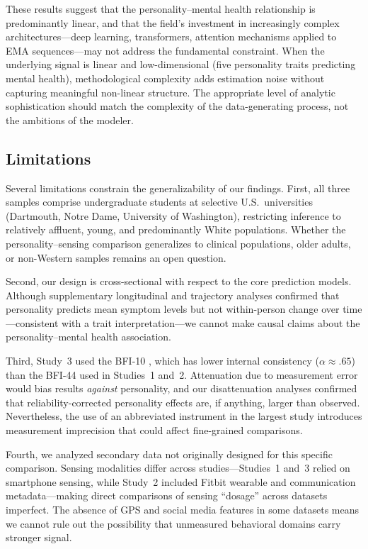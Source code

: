 \documentclass[12pt, a4paper]{article}
\begin{document}
These results suggest that the personality--mental health relationship is predominantly linear, and that the field's investment in increasingly complex architectures---deep learning, transformers, attention mechanisms applied to EMA sequences---may not address the fundamental constraint. When the underlying signal is linear and low-dimensional (five personality traits predicting mental health), methodological complexity adds estimation noise without capturing meaningful non-linear structure. The appropriate level of analytic sophistication should match the complexity of the data-generating process, not the ambitions of the modeler.

\subsection{Limitations}

Several limitations constrain the generalizability of our findings. First, all three samples comprise undergraduate students at selective U.S.\ universities (Dartmouth, Notre Dame, University of Washington), restricting inference to relatively affluent, young, and predominantly White populations. Whether the personality--sensing comparison generalizes to clinical populations, older adults, or non-Western samples remains an open question.

Second, our design is cross-sectional with respect to the core prediction models. Although supplementary longitudinal and trajectory analyses confirmed that personality predicts mean symptom levels but not within-person change over time---consistent with a trait interpretation---we cannot make causal claims about the personality--mental health association.

Third, Study~3 used the BFI-10 \citep{rammstedt2007measuring}, which has lower internal consistency ($\alpha \approx .65$) than the BFI-44 used in Studies~1 and~2. Attenuation due to measurement error would bias results \textit{against} personality, and our disattenuation analyses confirmed that reliability-corrected personality effects are, if anything, larger than observed. Nevertheless, the use of an abbreviated instrument in the largest study introduces measurement imprecision that could affect fine-grained comparisons.

Fourth, we analyzed secondary data not originally designed for this specific comparison. Sensing modalities differ across studies---Studies~1 and~3 relied on smartphone sensing, while Study~2 included Fitbit wearable and communication metadata---making direct comparisons of sensing ``dosage'' across datasets imperfect. The absence of GPS and social media features in some datasets means we cannot rule out the possibility that unmeasured behavioral domains carry stronger signal.
\end{document}
